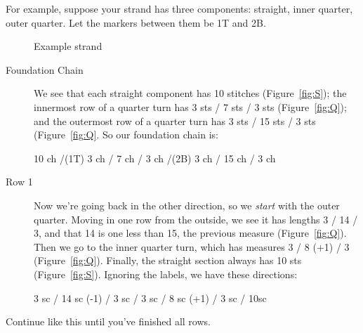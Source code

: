 \documentclass[openany]{book}
\begin{document}
For example, suppose your strand has three components: straight, inner quarter, outer quarter. Let the markers between them be 1T and 2B.


\begin{figure}[H]\centering
{}
\caption{Example strand}
\end{figure}

\begin{description}
\item[Foundation Chain] We see that each straight component has 10 stitches (Figure~\ref{fig:S}); the innermost row of a quarter turn has 3  sts / 7 sts / 3 sts (Figure~\ref{fig:Q}); and the outermost row of a quarter turn has 3 sts / 15 sts / 3 sts (Figure~\ref{fig:Q}. So our foundation chain is:
\begin{center}
10 ch /(1T) 3 ch / 7 ch / 3 ch /(2B) 3 ch / 15 ch / 3 ch
\end{center}
\item[Row 1] Now we're going back in the other direction, so we \textit{start} with the outer quarter. Moving in one row from the outside, we see it has lengths 3 / 14 / 3, and that 14 is one less than 15, the previous measure (Figure~\ref{fig:Q}). Then we go to the inner quarter turn, which has measures 3 / 8 (+1) / 3 (Figure~\ref{fig:Q}). Finally, the straight section always has 10 sts (Figure~\ref{fig:S}). Ignoring the labels, we have these directions:
\begin{center}
3 sc / 14 sc (-1) / 3 sc / 3 sc / 8 sc (+1) / 3 sc / 10sc
\end{center}
\end{description}

Continue like this until you've finished all rows.
\end{document}
